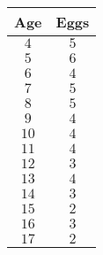 \begin{tabular}{cc} \toprule
Age   & Eggs      \\\midrule
$4$   & $5$       \\
$5$   & $6$       \\
$6$   & $4$       \\
$7$   & $5$       \\
$8$   & $5$       \\
$9$   & $4$       \\
$10$  & $4$       \\
$11$  & $4$       \\
$12$  & $3$       \\
$13$  & $4$       \\
$14$  & $3$       \\
$15$  & $2$       \\
$16$  & $3$       \\
$17$  & $2$       \\\bottomrule
\end{tabular}
